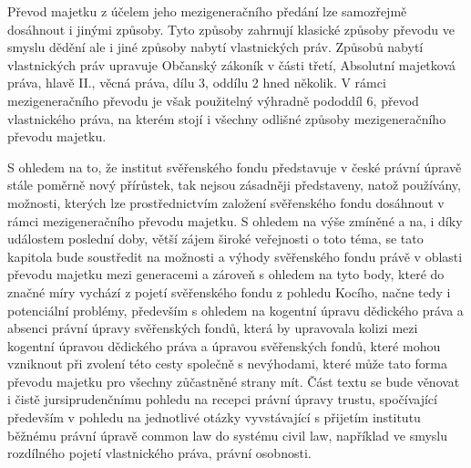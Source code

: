 \documentclass{article}
\begin{document}


Převod majetku z účelem jeho mezigeneračního předání lze samozřejmě dosáhnout i jinými způsoby. Tyto způsoby zahrnují klasické způsoby převodu ve smyslu dědění ale i jiné způsoby nabytí vlastnických práv. Způsobů nabytí vlastnických práv upravuje Občanský zákoník v části třetí, Absolutní majetková práva, hlavě II., věcná práva, dílu 3, oddílu 2 hned několik. V rámci mezigeneračního převodu je však použitelný výhradně pododdíl 6, převod vlastnického práva, na kterém stojí i všechny odlišné způsoby mezigeneračního převodu majetku.


S ohledem na to, že institut svěřenského fondu představuje v české právní úpravě stále poměrně nový přírůstek, tak nejsou zásadněji představeny, natož používány, možnosti, kterých lze prostřednictvím založení svěřenského fondu dosáhnout v rámci mezigeneračního převodu majetku. S ohledem na výše zmíněné a na, i díky událostem poslední doby, větší zájem široké veřejnosti o toto téma, se tato kapitola bude soustředit na možnosti a výhody svěřenského fondu právě v oblasti převodu majetku mezi generacemi a zároveň s ohledem na tyto body, které do značné míry vychází z pojetí svěřenského fondu z pohledu Kocího, načne tedy i potenciální problémy, především s ohledem na kogentní úpravu dědického práva a absenci právní úpravy svěřenských fondů, která by upravovala kolizi mezi kogentní úpravou dědického práva a úpravou svěřenských fondů, které mohou vzniknout při zvolení této cesty společně s nevýhodami, které může tato forma převodu majetku pro všechny zůčastněné strany mít. Část textu se bude věnovat i čistě jursiprudenčnímu pohledu na recepci právní úpravy trustu, spočívající především v pohledu na jednotlivé otázky vyvstávající s přijetím institutu běžnému právní úpravě common law do systému civil law, například ve smyslu rozdílného pojetí vlastnického práva, právní osobnosti.
\end{document}
